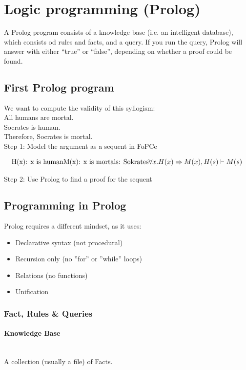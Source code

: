 \section{Logic programming (Prolog)}
A Prolog program consists of a knowledge base (i.e. an intelligent database), which consists od rules and facts, and a query.
If you run the query, Prolog will answer with either “true” or “false”, depending on whether a proof could be found.
\subsection{First Prolog program}
We want to compute the validity of this syllogism: \\
All humans are mortal. \\
Socrates is human. \\
Therefore, Socrates is mortal.\\
Step 1: Model the argument as a sequent in FoPCe

\[
\text{H(x): x is human}\\
\text{M(x): x is mortal}\\
\text{s: Sokrates}\\
\forall x.H(x) \Rightarrow M(x),H(s) \vdash M(s)
\]

Step 2: Use Prolog to find a proof for the sequent

\subsection{Programming in Prolog}
Prolog requires a different mindset, as it uses:
\begin{itemize}
	\item Declarative syntax (not procedural)
	\item Recursion only (no ''for'' or ''while'' loops)
	\item Relations (no functions)
	\item Unification
\end{itemize}

\subsubsection{Fact, Rules \& Queries}

\paragraph{Knowledge Base} \hfill \\
	A collection (usually a file) of Facts.

